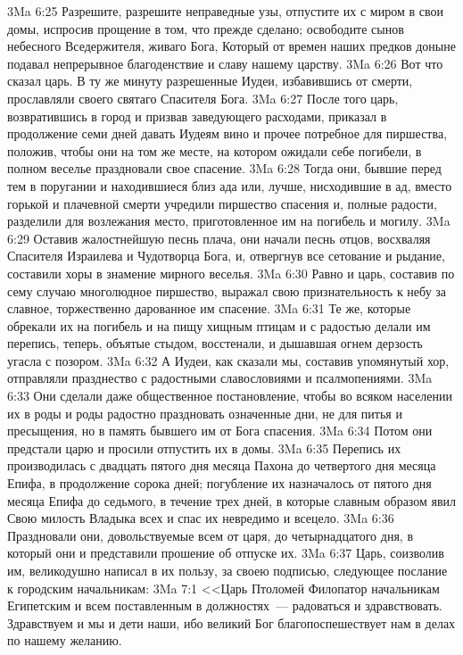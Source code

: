 \vs 3Ma 6:25 Разрешите, разрешите неправедные узы, отпустите их с миром в свои домы, испросив прощение в том, что прежде сделано; освободите сынов небесного Вседержителя, живаго Бога, Который от времен наших предков доныне подавал непрерывное благоденствие и славу нашему царству.
\vs 3Ma 6:26 Вот что сказал царь. В ту же минуту разрешенные Иудеи, избавившись от смерти, прославляли своего святаго Спасителя Бога.
\rsbpar\vs 3Ma 6:27 После того царь, возвратившись в город и призвав заведующего расходами, приказал в продолжение семи дней давать Иудеям вино и прочее потребное для пиршества, положив, чтобы они на том же месте, на котором ожидали себе погибели, в полном веселье праздновали свое спасение.
\vs 3Ma 6:28 Тогда они, бывшие перед тем в поругании и находившиеся близ ада или, лучше, нисходившие в ад, вместо горькой и плачевной смерти учредили пиршество спасения и, полные радости, разделили для возлежания место, приготовленное им на погибель и могилу.
\vs 3Ma 6:29 Оставив жалостнейшую песнь плача, они начали песнь отцов, восхваляя Спасителя Израилева и Чудотворца Бога, и, отвергнув все сетование и рыдание, составили хоры в знамение мирного веселья.
\vs 3Ma 6:30 Равно и царь, составив по сему случаю многолюдное пиршество, выражал свою признательность к небу за славное, торжественно дарованное им спасение.
\vs 3Ma 6:31 Те же, которые обрекали их на погибель и на пищу хищным птицам и с радостью делали им перепись, теперь, объятые стыдом, восстенали, и дышавшая огнем дерзость угасла с позором.
\vs 3Ma 6:32 А Иудеи, как сказали мы, составив упомянутый хор, отправляли празднество с радостными славословиями и псалмопениями.
\vs 3Ma 6:33 Они сделали даже общественное постановление, чтобы во всяком населении их в роды и роды радостно праздновать означенные дни, не для питья и пресыщения, но в память бывшего им от Бога спасения.
\vs 3Ma 6:34 Потом они предстали царю и просили отпустить их в домы.
\vs 3Ma 6:35 Перепись их производилась с двадцать пятого дня месяца Пахона до четвертого дня месяца Епифа, в продолжение сорока дней; погубление их назначалось от пятого дня месяца Епифа до седьмого, в течение трех дней, в которые славным образом явил Свою милость Владыка всех и спас их невредимо и всецело.
\vs 3Ma 6:36 Праздновали они, довольствуемые всем от царя, до четырнадцатого дня, в который они и представили прошение об отпуске их.
\vs 3Ma 6:37 Царь, соизволив им, великодушно написал в их пользу, за своею подписью, следующее послание к городским начальникам:
\vs 3Ma 7:1 <<Царь Птоломей Филопатор начальникам Египетским и всем поставленным в должностях~--- радоваться и здравствовать. Здравствуем и мы и дети наши, ибо великий Бог благопоспешествует нам в делах по нашему желанию.
